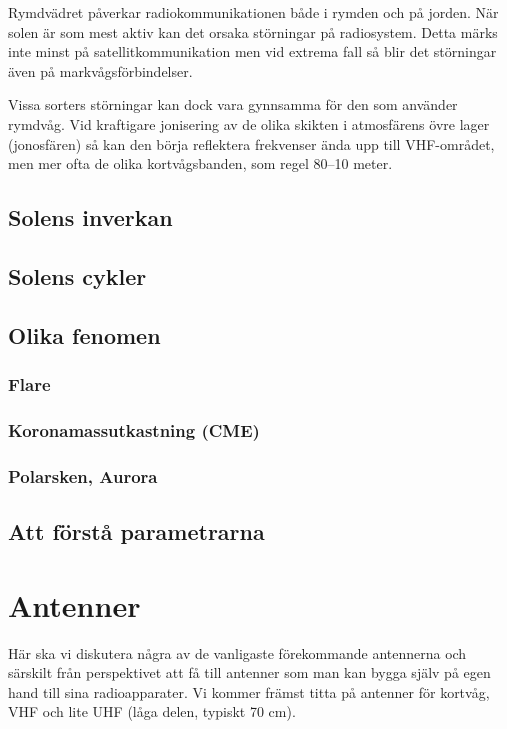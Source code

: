 Rymdvädret påverkar radiokommunikationen både i rymden och på jorden. När
solen är som mest aktiv kan det orsaka störningar på radiosystem. Detta märks
inte minst på satellitkommunikation men vid extrema fall så blir det
störningar även på markvågsförbindelser.

Vissa sorters störningar kan dock vara gynnsamma för den som använder
rymdvåg. Vid kraftigare jonisering av de olika skikten i atmosfärens övre
lager (jonosfären) så kan den börja reflektera frekvenser ända upp till
VHF-området, men mer ofta de olika kortvågsbanden, som regel 80--10 meter.

\subsection{Solens inverkan}

\subsection{Solens cykler}

\subsection{Olika fenomen}

\subsubsection{Flare}

\subsubsection{Koronamassutkastning (CME)}

\subsubsection{Polarsken, Aurora}
 

\subsection{Att förstå parametrarna}





\section{Antenner}

Här ska vi diskutera några av de vanligaste förekommande antennerna
och särskilt från perspektivet att få till antenner som man kan bygga
själv på egen hand till sina radioapparater. Vi kommer främst titta på
antenner för kortvåg, VHF och lite UHF (låga delen, typiskt 70 cm).


